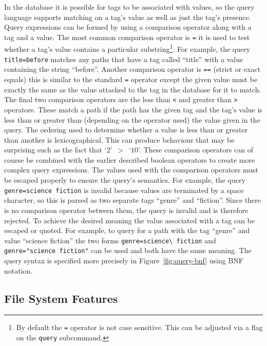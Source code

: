 In the database it is possible for tags to be associated with values, so the
query language supports matching on a tag's value as well as just the tag's
presence. Query expressions can be formed by using a comparison operator along
with a tag and a value. The most common comparison operator is \texttt{=} it is
used to test whether a tag's value contains a particular substring\footnote{By
default the \texttt{=} operator is not case sensitive. This can be adjusted via
a flag on the \texttt{query} subcommand.}. For example, the query
\texttt{title=before} matches any paths that have a tag called ``title'' with a
value containing the string ``before''. Another comparison operator is
\texttt{==} (strict or exact equals) this is similar to the standard \texttt{=}
operator except the given value must be exactly the same as the value attached
to the tag in the database for it to match. The final two comparison operators
are the less than \texttt{<} and greater than \texttt{>} operators. These match
a path if the path has the given tag and the tag's value is less than or
greater than (depending on the operator used) the value given in the query. The
ordering used to determine whether a value is less than or greater than another
is lexicographical. This can produce behaviour that may be surprising such as
the fact that `$2$'~$>$~`$10$'. These comparison operators can of course be
combined with the earlier described boolean operators to create more complex
query expressions. The values used with the comparison operators must be
escaped properly to ensure the query's semantics. For example, the query
\texttt{genre=science fiction} is invalid because values are terminated by a
space character, so this is parsed as two separate tags ``genre'' and
``fiction''. Since there is no comparison operator between them, the query is
invalid and is therefore rejected. To achieve the desired meaning the value
associated with a tag can be escaped or quoted. For example, to query for a
path with the tag ``genre'' and value ``science fiction'' the two forms
\verb_genre=science\ fiction_ and \texttt{genre="science fiction"} can be used
and both have the same meaning. The query syntax is specified more precisely in
Figure~\ref{fig:query-bnf}
using BNF notation.

\subsection{File System Features}
\label{sec:fs-features}

